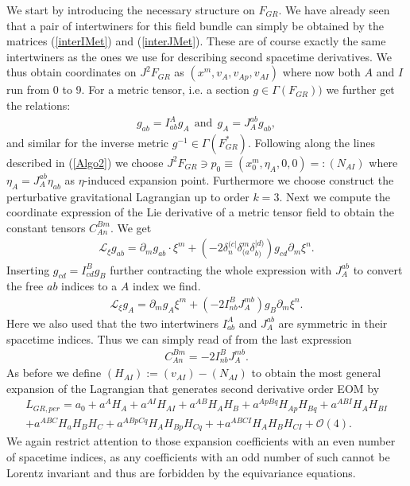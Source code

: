 \documentclass[a4paper,12pt, DIV=14, BCOR=5mm, twoside, headsepline]{scrbook}
\begin{document}
We start by introducing the necessary structure on $F_{GR}$. We have already seen that a pair of intertwiners for this field bundle can simply be obtained by the matrices  (\ref{interIMet}) and (\ref{interJMet}). These are of course exactly the same intertwiners as the ones we use for describing second spacetime derivatives. We thus obtain coordinates on $J^2F_{GR}$ as $(x^m,v_A,v_{Ap},v_{AI})$ where now both $A$ and $I$ run from 0 to 9. For a metric tensor, i.e. a section $g \in \Gamma(F_{GR}))$ we further get the relations:
\begin{align}
    g_{ab} = I^A _{ab} g_A \ \ \text{and} \ \ g_A = J^{ab}_{A} g_{ab},
\end{align}
and similar for the inverse metric $g^{-1} \in \Gamma(F_{GR}^{\ast})$.
Following along the lines described in (\ref{Algo2}) we choose $J^2F_{GR} \ni p_0 \equiv (x_0^m,\eta_A,0,0) =: (N_{AI})$ where $\eta_A = J^{ab}_A \eta_{ab}$ as $\eta$-induced expansion point. Furthermore we choose construct the perturbative gravitational Lagrangian up to order $k=3$. 
Next we compute the coordinate expression of the Lie derivative of a metric tensor field to obtain the constant tensors $C_{An}^{Bm}$. We get
\begin{align}
    \mathcal{L}_{\xi} g_{ab} = \partial_m g_{ab} \cdot \xi^m + \left (-2 \delta_n^{(c\vert} \delta_{(a}^m \delta_{b)}^{\vert d)} \right ) g_{cd} \partial_m \xi^n.
\end{align}
Inserting $g_{cd} = I^B_{cd} g_B$ further contracting the whole expression with $J^{ab}_A$ to convert the free $ab$ indices to a $A$ index we find.
\begin{align}
    \mathcal{L}_{\xi} g_A = \partial_m g_A \xi^m + \left (-2 I^B_{nb}J^{mb}_{A} \right )g_B \partial_m \xi ^n. 
\end{align}
Here we also used that the two intertwiners $I^A_{ab}$ and $J_A^{ab}$ are symmetric in their spacetime indices. Thus we can simply read of from the last expression
\begin{align}
    C_{An}^{Bm} = -2 I^B_{nb}J_A^{mb}.
\end{align}
As before we define $(H_{AI}) := (v_{AI}) - (N_{AI})$ to obtain the most general expansion of the Lagrangian that generates second derivative order EOM by
\begin{align}\label{LGR}
    L_{GR,per} =  a_0 + a^A H_A + a^{AI}H_{AI} + a^{AB} H_{A}H_{B} + a^{ApBq} H_{Ap}H_{Bq} + a^{ABI} H_{A} H_{BI} \\
    + a^{ABC} H_a H_B H_C + a^{ABpCq} H_{A}H_{Bp}H_{Cq} +
    + a^{ABCI} H_A H_B H_{CI} 
    + \mathcal{O}(4).
\end{align}
We again restrict attention to those expansion coefficients with an even number of spacetime indices, as any coefficients with an odd number of such cannot be Lorentz invariant and thus are forbidden by the equivariance equations.
\end{document}
